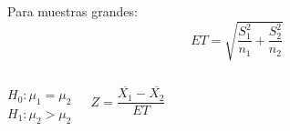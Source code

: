 \documentclass{beamer}
\begin{document}
\begin{frame}
  Para muestras grandes: \[ET = \sqrt{\frac{S_1 ^ 2}{n_1} + \frac{S_2 ^ 2}{n_2}}\]

\begin{columns}
   $H_0: \mu_1 = \mu_2$ \\
   $H_1: \mu_2 > \mu_2$


      \[\textit{Z} = \frac{\overline{X_1} - \overline{X_2}}{ET}\]
\end{columns}

\end{frame}
\end{document}
